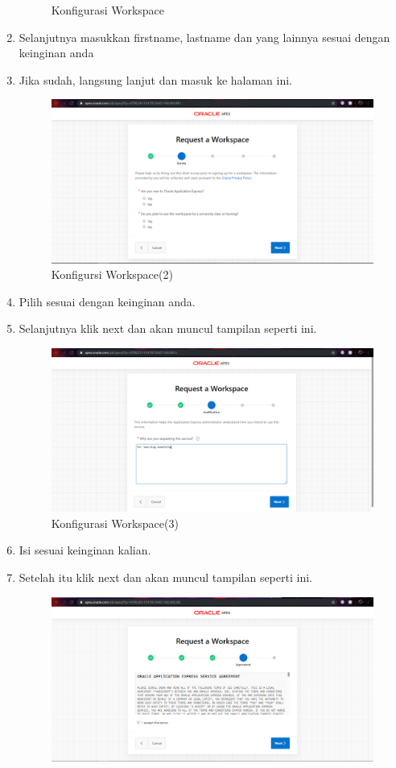 \documentclass{article}
\begin{document}
\begin{enumerate}
\begin{figure}[!htbp]
        \caption{Konfigurasi Workspace}
    \end{figure}
    \item Selanjutnya masukkan firstname, lastname dan yang lainnya sesuai dengan keinginan anda
    \item Jika sudah, langsung lanjut dan masuk ke halaman ini.
    \begin{figure}[!htbp]
        \centering
        \includegraphics[scale=0.3]{3.PNG}
        \caption{Konfigursi Workspace(2)}
    \end{figure}
\newpage
    \item Pilih sesuai dengan keinginan anda.
    \item Selanjutnya klik next dan akan muncul tampilan seperti ini.
    \begin{figure}[!htbp]
        \centering
        \includegraphics[scale=0.3]{4.PNG}
        \caption{Konfigurasi Workspace(3)}
    \end{figure}
    \item Isi sesuai keinginan kalian.
    \item Setelah itu klik next dan akan muncul tampilan seperti ini.
    \begin{figure}[!htbp]
        \centering
        \includegraphics[scale=0.3]{5.PNG}

\end{figure}
\end{enumerate}
\end{document}

